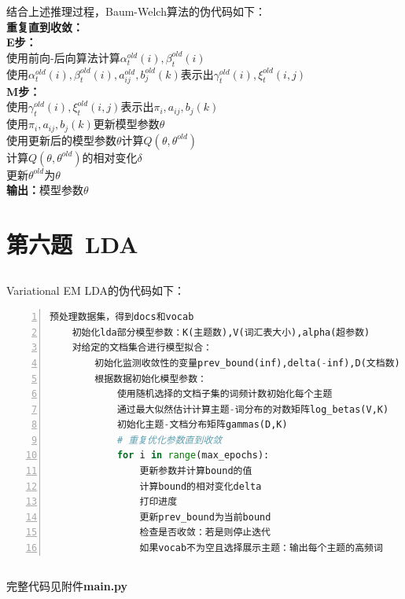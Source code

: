\documentclass[12pt,a4paper]{article}
\begin{document}
结合上述推理过程，Baum-Welch算法的伪代码如下：\\
\textbf{重复直到收敛：}\\
\quad \textbf{E步：}\\
\quad \quad 使用前向-后向算法计算$\alpha_{t}^{old}(i),\beta_{t}^{old}(i)$\\
\quad \quad 使用$\alpha_t^{old}(i),\beta_t^{old}(i),a_{ij}^{old},b_j^{old}{(k)}$表示出$\gamma_{t}^{old}(i),\xi_{t}^{old}(i,j)$\\
\quad \textbf{M步：}\\
\quad \quad 使用$\gamma_{t}^{old}(i),\xi_{t}^{old}(i,j)$表示出$\pi_i,a_{ij},b_j(k)$\\
\quad \quad 使用$\pi_i,a_{ij},b_j(k)$更新模型参数$\theta$\\
\quad \quad 使用更新后的模型参数$\theta$计算$Q(\theta,\theta^{old})$\\
\quad \quad 计算$Q(\theta,\theta^{old})$的相对变化$\delta$\\
\quad \quad 更新$\theta^{old}$为$\theta$\\
\textbf{输出：}模型参数$\theta$
\section{第六题\ LDA}
\subsection{}
Variational EM LDA的伪代码如下：
\begin{lstlisting}[language=Python, numbers = left, escapechar=|]
    预处理数据集，得到docs和vocab
    初始化lda部分模型参数：K(主题数),V(词汇表大小),alpha(超参数)
    对给定的文档集合进行模型拟合：
        初始化监测收敛性的变量prev_bound(inf),delta(-inf),D(文档数)
        根据数据初始化模型参数：
            使用随机选择的文档子集的词频计数初始化每个主题
            通过最大似然估计计算主题-词分布的对数矩阵log_betas(V,K)
            初始化主题-文档分布矩阵gammas(D,K)
            # 重复优化参数直到收敛
            for i in range(max_epochs):
                更新参数并计算bound的值
                计算bound的相对变化delta
                打印进度
                更新prev_bound为当前bound
                检查是否收敛：若是则停止迭代
                如果vocab不为空且选择展示主题：输出每个主题的高频词
\end{lstlisting}
\subsection{}
完整代码见附件\textbf{main.py}
\end{document}
